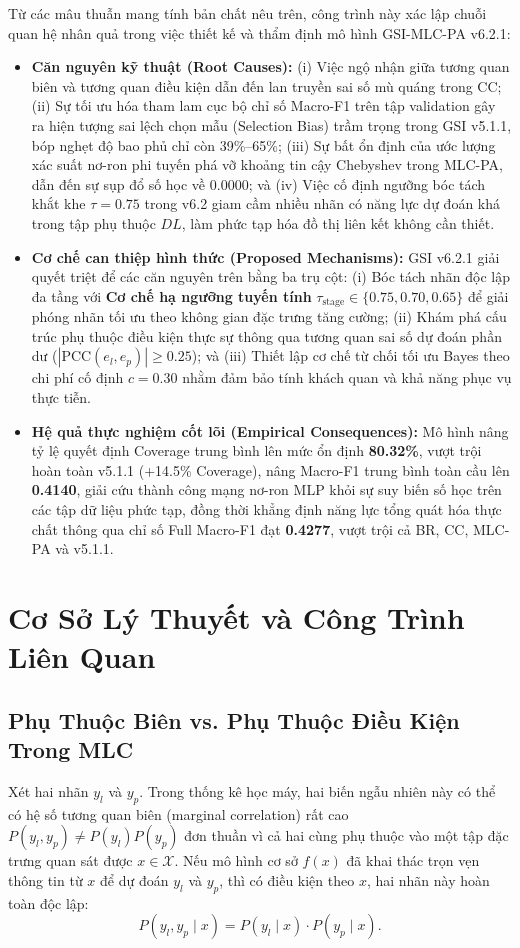 \documentclass[10pt,a4paper,twoside]{article}
\begin{document}
Từ các mâu thuẫn mang tính bản chất nêu trên, công trình này xác lập chuỗi quan hệ nhân quả trong việc thiết kế và thẩm định mô hình GSI-MLC-PA v6.2.1:
\begin{itemize}[leftmargin=*]
    \item \textbf{Căn nguyên kỹ thuật (Root Causes):} (i) Việc ngộ nhận giữa tương quan biên và tương quan điều kiện dẫn đến lan truyền sai số mù quáng trong CC; (ii) Sự tối ưu hóa tham lam cục bộ chỉ số Macro-F1 trên tập validation gây ra hiện tượng sai lệch chọn mẫu (Selection Bias) trầm trọng trong GSI v5.1.1, bóp nghẹt độ bao phủ chỉ còn 39\%--65\%; (iii) Sự bất ổn định của ước lượng xác suất nơ-ron phi tuyến phá vỡ khoảng tin cậy Chebyshev trong MLC-PA, dẫn đến sự sụp đổ số học về $0.0000$; và (iv) Việc cố định ngưỡng bóc tách khắt khe $\tau = 0.75$ trong v6.2 giam cầm nhiều nhãn có năng lực dự đoán khá trong tập phụ thuộc $DL$, làm phức tạp hóa đồ thị liên kết không cần thiết.
    \item \textbf{Cơ chế can thiệp hình thức (Proposed Mechanisms):} GSI v6.2.1 giải quyết triệt để các căn nguyên trên bằng ba trụ cột: (i) Bóc tách nhãn độc lập đa tầng với \textbf{Cơ chế hạ ngưỡng tuyến tính} $\tau_{\text{stage}} \in \{0.75, 0.70, 0.65\}$ để giải phóng nhãn tối ưu theo không gian đặc trưng tăng cường; (ii) Khám phá cấu trúc phụ thuộc điều kiện thực sự thông qua tương quan sai số dự đoán phần dư ($|\text{PCC}(e_l, e_p)| \ge 0.25$); và (iii) Thiết lập cơ chế từ chối tối ưu Bayes theo chi phí cố định $c = 0.30$ nhằm đảm bảo tính khách quan và khả năng phục vụ thực tiễn.
    \item \textbf{Hệ quả thực nghiệm cốt lõi (Empirical Consequences):} Mô hình nâng tỷ lệ quyết định Coverage trung bình lên mức ổn định \textbf{80.32\%}, vượt trội hoàn toàn v5.1.1 (+14.5\% Coverage), nâng Macro-F1 trung bình toàn cầu lên \textbf{0.4140}, giải cứu thành công mạng nơ-ron MLP khỏi sự suy biến số học trên các tập dữ liệu phức tạp, đồng thời khẳng định năng lực tổng quát hóa thực chất thông qua chỉ số Full Macro-F1 đạt \textbf{0.4277}, vượt trội cả BR, CC, MLC-PA và v5.1.1.
\end{itemize}

\section{Cơ Sở Lý Thuyết và Công Trình Liên Quan}

\subsection{Phụ Thuộc Biên vs. Phụ Thuộc Điều Kiện Trong MLC}
Xét hai nhãn $y_l$ và $y_p$. Trong thống kê học máy, hai biến ngẫu nhiên này có thể có hệ số tương quan biên (marginal correlation) rất cao $P(y_l, y_p) \neq P(y_l)P(y_p)$ đơn thuần vì cả hai cùng phụ thuộc vào một tập đặc trưng quan sát được $x \in \mathcal{X}$. Nếu mô hình cơ sở $f(x)$ đã khai thác trọn vẹn thông tin từ $x$ để dự đoán $y_l$ và $y_p$, thì có điều kiện theo $x$, hai nhãn này hoàn toàn độc lập:
\begin{equation}
P(y_l, y_p \mid x) = P(y_l \mid x) \cdot P(y_p \mid x).
\end{equation}
\end{document}
